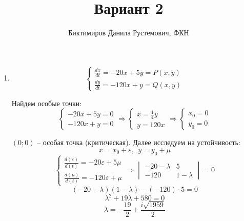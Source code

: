 \documentclass[11pt]{article}
\begin{document}
	
	\author{Биктимиров Данила Рустемович, ФКН}
	\title{Вариант 2}
	\date{}
	\maketitle
	
	\medskip
	
	\begin{enumerate}
		\item $$\begin{cases}
			\frac{dx}{dt} = -20x+5y = P(x,y)\\
			\frac{dy}{dt} = -120x+y = Q(x,y)
		\end{cases}$$
		
		Найдем особые точки: $$\begin{cases}
			-20x+5y = 0\\
			-120x+y = 0
		\end{cases}\Rightarrow\begin{cases}
			x = \frac{1}{4} y\\
			y = 120x
		\end{cases}\Rightarrow\begin{cases}
			x_0 = 0\\
			y_0 = 0
		\end{cases}$$
		
		$(0; 0)$ -- особая точка (критическая). Далее исследуем на устойчивость:
		$$ x = x_0 + \varepsilon, \:\: y = y_0 + \mu$$
		$$\begin{cases}
			\frac{d(\varepsilon)}{d(t)} = -20\varepsilon+5\mu\\
			\frac{d(\mu)}{d(t)} = -120\varepsilon+\mu 
		\end{cases}\Rightarrow \begin{vmatrix}
			-20-\lambda & 5\\
			-120 & 1 - \lambda
		\end{vmatrix} = 0$$
		$$ (-20-\lambda)(1-\lambda)- (-120)\cdot 5 =0 $$
		$$ \lambda ^2 + 19 \lambda + 580 = 0 $$
		$$ \lambda = -\frac{19}{2} \pm \frac{ i \sqrt{1959}}{2} $$
		

\end{enumerate}
\end{document}
